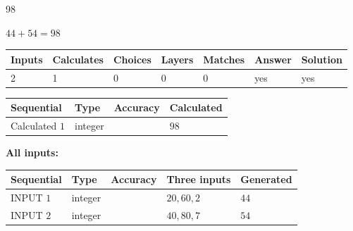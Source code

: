\documentclass{ctexart}
\begin{document}
 

98
 
 
\noindent{}
 
 

 
 
 
\noindent{}
 
 

$ %
44 +  %
54=   %
98$
 
 
\noindent{}
 
 

 
   
   
   
   
\noindent\begin{tabular}{|l|l|l|l|l|l|l|}
 \hline
Inputs & Calculates & Choices & Layers & Matches & Answer & Solution \\ \hline
 2  & 
 1  & 
 0
  & 
 0  & 
 0  & 
  yes & 
  yes 
  \\ \hline
 \end{tabular}
   
   
   
   
\noindent{}
   
   
  
  
\noindent\begin{tabular}{|l|l|l|l|}
\hline
 Sequential & Type & Accuracy & Calculated \\ 
\hline
 
 
  Calculated $  1 $ & integer &  & 
  $ 98 $ 
 \\  \hline  
 \end{tabular}
   
   
   
   
\noindent\vspace{0.1in}\hspace{-0.08in} {\textbf{\Large{All inputs: }}}
   
   
  
  
\noindent\begin{tabular}{|l|l|l|l|l|}
\hline
 Sequential & Type & Accuracy & Three inputs & Generated \\ 
\hline
 
 
  INPUT $  1 $ & integer &  & $
 20
 , 
 60
 , 
 2
 $ & $ 44 $ 
 \\  \hline  
 
 
  INPUT $  2 $ & integer &  & $
 40
 , 
 80
 , 
 7
 $ & $ 54 $ 
 \\  \hline  
 \end{tabular}
   
\end{document}
